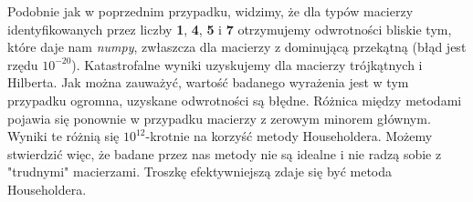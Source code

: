 Podobnie jak w poprzednim przypadku, widzimy, że dla typów macierzy
identyfikowanych przez liczby \textbf{1}, \textbf{4}, \textbf{5} i \textbf{7}
otrzymujemy odwrotności bliskie tym, które daje nam \textit{numpy}, zwłaszcza
dla macierzy z dominującą przekątną (błąd jest rzędu $10^{-20}$).
Katastrofalne wyniki uzyskujemy dla macierzy trójkątnych i Hilberta.
Jak można zauważyć, wartość badanego wyrażenia jest w tym przypadku ogromna,
uzyskane odwrotności są błędne. Różnica między metodami pojawia się ponownie w
przypadku macierzy z zerowym minorem głównym. Wyniki te różnią się
$10^{12}$-krotnie na korzyść metody Householdera. Możemy stwierdzić więc, że
badane przez nas metody nie są idealne i nie radzą sobie z
"trudnymi" macierzami. Troszkę efektywniejszą zdaje się być metoda Householdera.

